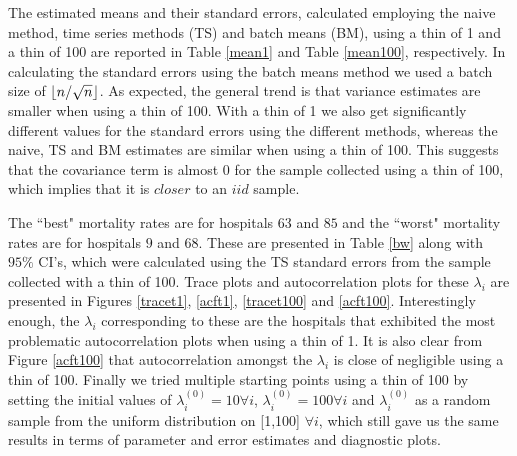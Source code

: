 \documentclass[12pt, leqno]{article}
\DeclarePairedDelimiter\floor{\lfloor}{\rfloor}
\begin{document}
The estimated means and
their standard errors, calculated employing the naive method, time series methods (TS) and
batch means (BM), using a thin of 1 and a thin of 100 are
reported in Table \ref{mean1} and Table \ref{mean100}, respectively. In calculating the standard errors using
the batch means method we used a batch size of
$\floor{n/ \sqrt{n}}$. As expected, the general trend is that 
variance estimates are smaller when using a thin of 100. With a thin
of 1 we also get significantly
different values for the standard errors using the different methods,
whereas the naive, TS and BM estimates are similar when using a thin of 100. This suggests
that the covariance term is almost $0$ for the sample collected using a thin of 100, which implies that it is $closer$
to an $iid$ sample. 

The ``best" mortality rates are for
hospitals $63$ and $85$ and the ``worst" mortality rates are for
hospitals $9$
and $68$. These are presented in Table \ref{bw} along with $95\%$ CI's,
which were calculated using the TS standard errors from the sample
collected with a thin of 100. Trace
plots and autocorrelation plots for these $\lambda_i$ are presented in Figures \ref{tracet1},
\ref{acft1}, \ref{tracet100} and \ref{acft100}. Interestingly enough,
the $\lambda_i$ corresponding to 
these are the hospitals that exhibited the most problematic autocorrelation
plots when using a thin of 1. It is also clear from Figure \ref{acft100} that autocorrelation amongst
the $\lambda_i$ is close of negligible using a thin of 100. Finally we tried
multiple starting points using a thin of 100 by setting the
initial values of $\lambda_i^{(0)} = 10 \forall i$, $\lambda_i^{(0)} = 100
\forall i$ and $\lambda_i^{(0)}$ as a random sample from the uniform
distribution on [1,100]
$\forall i$, which still gave us the same results in terms of
parameter and error
estimates and diagnostic plots. 

\begin{table}[ht]
\centering
{}
\caption{Best and Worst Hospitals based on mortality rates using a thin of 100} 
\label{bw}
\end{table}
\end{document}

